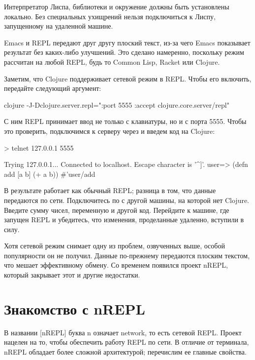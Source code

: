 Интерпретатор Лиспа, библиотеки и окружение должны быть установлены локально. Без специальных ухищрений нельзя подключиться к Лиспу, запущенному на удаленной машине.

Emacs и REPL передают друг другу плоский текст, из-за чего Emacs показывает результат без каких-либо улучшений. Это сделано намеренно, поскольку режим  рассчитан на любой REPL, будь то Common Lisp, Racket или Clojure.

Заметим, что Clojure поддерживает сетевой режим в REPL. Чтобы его включить, передайте следующий аргумент:

\begin{english}
  \begin{bash}
clojure -J-Dclojure.server.repl="{:port 5555 :accept clojure.core.server/repl}"
  \end{bash}
\end{english}

С ним REPL принимает ввод не только с клавиатуры, но и с порта 5555. Чтобы это проверить, подключимся к серверу через  и введем код на Clojure:

\begin{english}
  \begin{text}
> telnet 127.0.0.1 5555

Trying 127.0.0.1...
Connected to localhost.
Escape character is '^]'.
user=> (defn add [a b]
         (+ a b))
#'user/add
  \end{text}
\end{english}

В результате  работает как обычный REPL; разница в том, что данные передаются по сети. Подключитесь по  с другой машины, на которой нет Clojure. Введите сумму чисел, переменную и другой код. Перейдите к машине, где запущен REPL и убедитесь, что изменения, проделанные удаленно, вступили в силу.

Хотя сетевой режим снимает одну из проблем, озвученных выше, особой популярности он не получил. Данные по-прежнему передаются плоским текстом, что мешает эффективному обмену. Со временем появился проект nREPL, который закрывает этот и другие недостатки.

\section{Знакомство с nREPL}

\def\urlnreplorg{https://nrepl.org}

В названии \footurl{nREPL}{\urlnreplorg}[nREPL] буква n означает network, то есть сетевой REPL. Проект нацелен на то, чтобы обеспечить работу REPL по сети. В отличие от терминала, nREPL обладает более сложной архитектурой; перечислим ее главные свойства.

